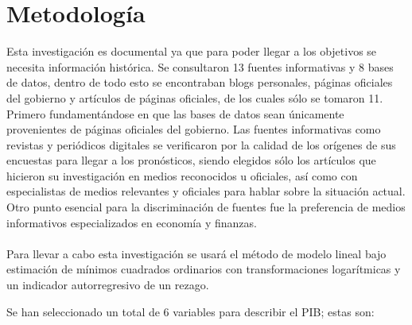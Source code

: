 \documentclass[a4paper]{article}
\begin{document}
\section{Metodología}

Esta investigación es documental ya que para poder llegar a los objetivos se necesita información histórica. Se consultaron 13 fuentes informativas y 8 bases de datos, dentro de todo esto se encontraban blogs personales, páginas oficiales del gobierno y artículos de páginas oficiales, de los cuales sólo se tomaron 11. Primero fundamentándose en que las bases de datos sean únicamente provenientes de páginas oficiales del gobierno. Las fuentes informativas como revistas y periódicos digitales se verificaron por la calidad de los orígenes de sus encuestas para llegar a los pronósticos, siendo elegidos sólo los artículos que hicieron su investigación en medios reconocidos u oficiales, así como con especialistas de medios relevantes y oficiales para hablar sobre la situación actual. Otro punto esencial para la discriminación de fuentes fue la preferencia de medios informativos especializados en economía y finanzas. \cite{Banxico1} \cite{Banxico2} \cite{Expansion1} \cite{Expansion2} \cite{Economista} \cite{Forbes}
\\
\\

Para llevar a cabo esta investigación se usará el método de modelo lineal bajo estimación de mínimos cuadrados ordinarios con transformaciones logarítmicas y un indicador autorregresivo de un rezago.

Se han seleccionado un total de 6 variables para describir el PIB; estas son:
\end{document}
